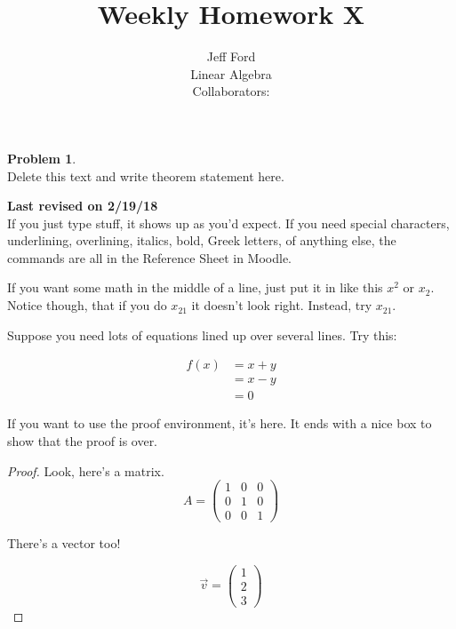 \documentclass[12 pt]{article}
\theoremstyle{definition}
\newtheorem*{prob}{Problem}
\newcommand\m[1]{\begin{pmatrix}#1\end{pmatrix}}
\newcommand\rev[1]{\textbf{Last revised on {#1}}\\}
\begin{document}
 
 
\title{Weekly Homework X}%
\author{Jeff Ford\\ %
Linear Algebra\\
Collaborators: } %
 
\maketitle
 
\begin{prob}{1}\\ %
Delete this text and write theorem statement here.
\end{prob}
\rev{2/19/18} %

If you just type stuff, it shows up as you'd expect. If you need special characters, underlining, overlining, italics, bold, Greek letters, of anything else, the commands are all in the Reference Sheet in Moodle.

If you want some math in the middle of a line, just put it in like this $x^2$ or $x_2$. Notice though, that if you do $x_21$ it doesn't look right. Instead, try $x_{21}$.

Suppose you need lots of equations lined up over several lines. Try this:

\begin{align*}
f(x) &= x+y\\
&= x-y\\
&=0
\end{align*}

If you want to use the proof environment, it's here. It ends with a nice box to show that the proof is over.

\begin{proof}
Look, here's a matrix.
$$A = \m{1&0&0\\0&1&0\\0&0&1}$$

There's a vector too!

$$\vec{v} = \m{1\\2\\3}$$
\end{proof}

 
\end{document}
